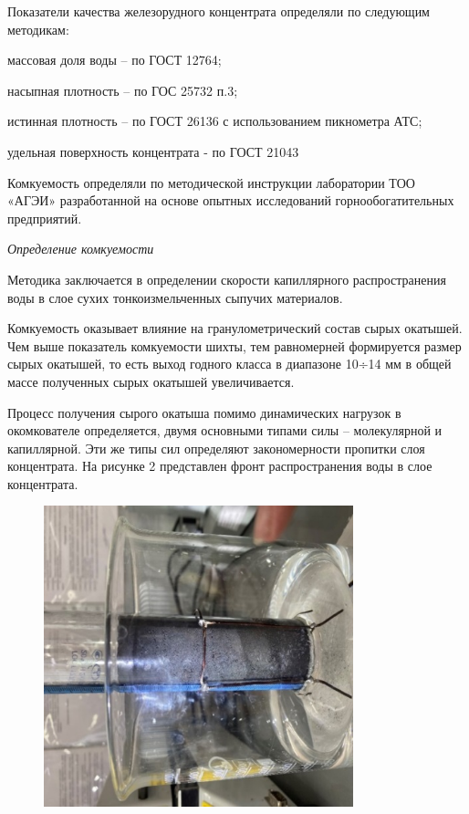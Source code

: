 Показатели качества железорудного концентрата определяли по следующим
методикам:

массовая доля воды -- по ГОСТ 12764;

насыпная плотность -- по ГОС 25732 п.3;

истинная плотность -- по ГОСТ 26136 с использованием пикнометра АТС;

удельная поверхность концентрата - по ГОСТ 21043

Комкуемость определяли по методической инструкции лаборатории ТОО «АГЭИ»
разработанной на основе опытных исследований горнообогатительных
предприятий.

\emph{Определение комкуемости}

Методика заключается в определении скорости капиллярного распространения
воды в слое сухих тонкоизмельченных сыпучих материалов.

Комкуемость оказывает влияние на гранулометрический состав сырых
окатышей. Чем выше показатель комкуемости шихты, тем равномерней
формируется размер сырых окатышей, то есть выход годного класса в
диапазоне 10÷14 мм в общей массе полученных сырых окатышей
увеличивается.

Процесс получения сырого окатыша помимо динамических нагрузок в
окомкователе определяется, двумя основными типами силы -- молекулярной и
капиллярной. Эти же типы сил определяют закономерности пропитки слоя
концентрата. На рисунке 2 представлен фронт распространения воды в слое
концентрата.


\begin{figure}[H]
	\centering
	\includegraphics[width=0.8\textwidth]{media/chem2/image62}
	\caption*{}
\end{figure}


